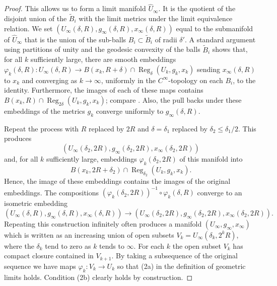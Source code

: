 \begin{proof}
This allows us to form a limit manifold $\widehat U_\infty$. It is
the quotient of the disjoint union of the $\widetilde B_i$ with the
limit metrics under the limit equivalence relation. We set
$(U_\infty(\delta,R),g_\infty(\delta,R),x_\infty(\delta,R))$ equal
to the submanifold of $\widehat U_\infty$ that is the union of the
sub-balls $B_i\subset \widetilde B_i$ of radii $\delta'$. A standard
argument using partitions of unity and the geodesic convexity of the
balls $\widetilde B_i$ shows that, for all $k$ sufficiently large,
there are smooth embeddings $\varphi_k(\delta,R)\colon
U_\infty(\delta,R)\to B(x_k,R+\delta)\cap \operatorname{Reg}_\delta(U_k,g_k,x_k)$ sending $x_\infty(\delta,R)$ to $x_k$ and
converging as $k\rightarrow \infty$, uniformly in the
$C^\infty$-topology on each $B_i$, to the identity. Furthermore, the
images of each of these maps contains $B(x_k,R)\cap \operatorname{Reg}_{2\delta}(U_k,g_k,x_k)$; compare \cite{Cheeger}. Also, the pull
backs under these embeddings of the metrics $g_k$ converge uniformly
to $g_\infty(\delta,R)$.

Repeat the process with $R$ replaced by $2R$ and $\delta=\delta_1$
replaced by $\delta_2\le \delta_1/2$. This produces
$$\left(U_\infty(\delta_2,2R),g_\infty(\delta_2,2R),x_\infty(\delta_2,2R)\right)$$
and, for all $k$ sufficiently large, embeddings
$\varphi_k(\delta_2,2R)$ of this manifold into
$$B(x_k,2R+\delta_2)\cap \operatorname{Reg}_{\delta_2}(U_k,g_k,x_k).$$ Hence,
the image of these embeddings contains the images of the original
embeddings. The compositions $(\varphi_k(\delta_2,2R))^{-1}\circ
\varphi_k(\delta,R)$ converge to an isometric embedding
$$\left(U_\infty(\delta,R),g_\infty(\delta,R),x_\infty(\delta,R)\right)\to
\left(U_\infty(\delta_2,2R),g_\infty(\delta_2,2R),x_\infty(\delta_2,2R)\right).$$
Repeating  this construction infinitely often produces a manifold
$(U_\infty,g_\infty,x_\infty)$ which is written as an increasing union of open
subsets $V_k=U_\infty(\delta_k,2^kR)$, where the $\delta_k$ tend to zero as $k$
tends to $\infty$. For each $k$ the open subset $V_k$ has compact closure
contained in $V_{k+1}$. By taking a subsequence of the original sequence we
have maps $\varphi_k\colon V_k\to U_k$ so that (2a) in the definition of
geometric limits holds. Condition (2b) clearly holds by construction.
\end{proof}

